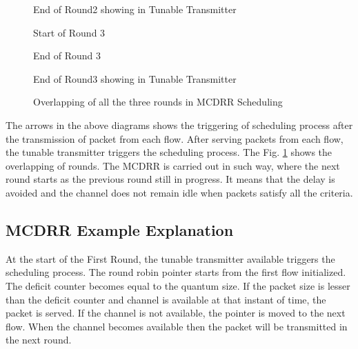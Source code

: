 \documentclass[conference,letterpaper]{IEEEtran}
\begin{document}
\begin{figure}[hbtp]
\centering
{}
\caption{End of Round2 showing in Tunable Transmitter}
\end{figure}

\begin{figure}[hbtp]
\centering
{}
\caption{Start of Round 3}
\end{figure}

\begin{figure}[hbtp]
\centering
{}
\caption{End of Round 3}
\end{figure}

\begin{figure}[hbtp]
\centering
{}
\caption{End of Round3 showing in Tunable Transmitter}
\end{figure}

\begin{figure}[hbtp]
\centering
{}
\caption{Overlapping of all the three rounds in MCDRR Scheduling}
\label{fig:overlapping}
\end{figure}

The arrows in the above diagrams shows the triggering of scheduling process
after the transmission of packet from each flow. After serving packets from each
flow, the tunable transmitter triggers the scheduling process. The
Fig. \ref{fig:overlapping} shows the overlapping of rounds. The MCDRR is carried
out in such way, where the next round starts as the previous round still in
progress. It means that the delay is avoided and the channel does not remain
idle when packets satisfy all the criteria.

\subsection{MCDRR Example Explanation}
At the start of the First Round, the tunable transmitter available triggers the
scheduling process. The round robin pointer starts from the first flow
initialized. The deficit counter becomes equal to the quantum size. If the
packet size is lesser than the deficit counter and channel is available at that
instant of time, the packet is served. If the channel is not available, the
pointer is moved to the next flow. When the channel becomes available then the
packet will be transmitted in the next round.
\end{document}
